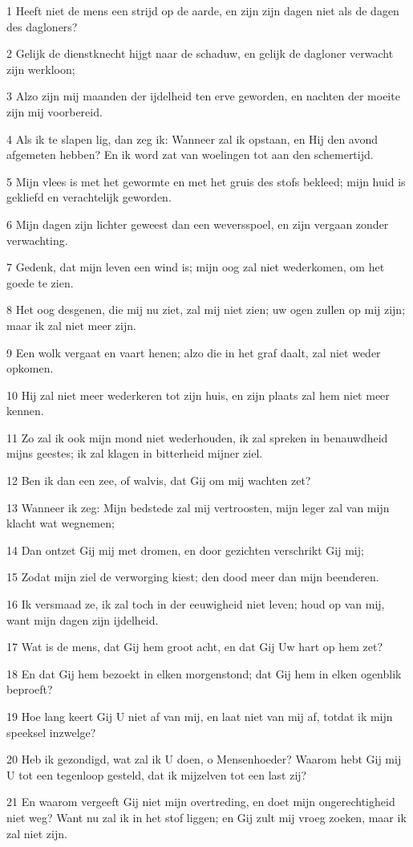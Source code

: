 \par 1 Heeft niet de mens een strijd op de aarde, en zijn zijn dagen niet als de dagen des dagloners?
\par 2 Gelijk de dienstknecht hijgt naar de schaduw, en gelijk de dagloner verwacht zijn werkloon;
\par 3 Alzo zijn mij maanden der ijdelheid ten erve geworden, en nachten der moeite zijn mij voorbereid.
\par 4 Als ik te slapen lig, dan zeg ik: Wanneer zal ik opstaan, en Hij den avond afgemeten hebben? En ik word zat van woelingen tot aan den schemertijd.
\par 5 Mijn vlees is met het gewormte en met het gruis des stofs bekleed; mijn huid is gekliefd en verachtelijk geworden.
\par 6 Mijn dagen zijn lichter geweest dan een weversspoel, en zijn vergaan zonder verwachting.
\par 7 Gedenk, dat mijn leven een wind is; mijn oog zal niet wederkomen, om het goede te zien.
\par 8 Het oog desgenen, die mij nu ziet, zal mij niet zien; uw ogen zullen op mij zijn; maar ik zal niet meer zijn.
\par 9 Een wolk vergaat en vaart henen; alzo die in het graf daalt, zal niet weder opkomen.
\par 10 Hij zal niet meer wederkeren tot zijn huis, en zijn plaats zal hem niet meer kennen.
\par 11 Zo zal ik ook mijn mond niet wederhouden, ik zal spreken in benauwdheid mijns geestes; ik zal klagen in bitterheid mijner ziel.
\par 12 Ben ik dan een zee, of walvis, dat Gij om mij wachten zet?
\par 13 Wanneer ik zeg: Mijn bedstede zal mij vertroosten, mijn leger zal van mijn klacht wat wegnemen;
\par 14 Dan ontzet Gij mij met dromen, en door gezichten verschrikt Gij mij;
\par 15 Zodat mijn ziel de verworging kiest; den dood meer dan mijn beenderen.
\par 16 Ik versmaad ze, ik zal toch in der eeuwigheid niet leven; houd op van mij, want mijn dagen zijn ijdelheid.
\par 17 Wat is de mens, dat Gij hem groot acht, en dat Gij Uw hart op hem zet?
\par 18 En dat Gij hem bezoekt in elken morgenstond; dat Gij hem in elken ogenblik beproeft?
\par 19 Hoe lang keert Gij U niet af van mij, en laat niet van mij af, totdat ik mijn speeksel inzwelge?
\par 20 Heb ik gezondigd, wat zal ik U doen, o Mensenhoeder? Waarom hebt Gij mij U tot een tegenloop gesteld, dat ik mijzelven tot een last zij?
\par 21 En waarom vergeeft Gij niet mijn overtreding, en doet mijn ongerechtigheid niet weg? Want nu zal ik in het stof liggen; en Gij zult mij vroeg zoeken, maar ik zal niet zijn.

